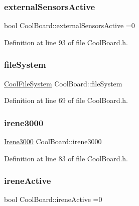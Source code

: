 \subsubsection{\texorpdfstring{external\+Sensors\+Active}{externalSensorsActive}}
{\footnotesize\ttfamily bool Cool\+Board\+::external\+Sensors\+Active =0\hspace{0.3cm}{\ttfamily [private]}}



Definition at line 93 of file Cool\+Board.\+h.

\mbox{\label{class_cool_board_a42c2586fbb13ff7f06538e9284e8538d}} 
\subsubsection{\texorpdfstring{file\+System}{fileSystem}}
{\footnotesize\ttfamily \hyperlink{class_cool_file_system}{Cool\+File\+System} Cool\+Board\+::file\+System\hspace{0.3cm}{\ttfamily [private]}}



Definition at line 69 of file Cool\+Board.\+h.

\mbox{\label{class_cool_board_ad103718ce316006c4695b8eb312eaf11}} 
\subsubsection{\texorpdfstring{irene3000}{irene3000}}
{\footnotesize\ttfamily \hyperlink{class_irene3000}{Irene3000} Cool\+Board\+::irene3000\hspace{0.3cm}{\ttfamily [private]}}



Definition at line 83 of file Cool\+Board.\+h.

\mbox{\label{class_cool_board_a9c3f7ac625481ee2ae802a25d97a4ae0}} 
\subsubsection{\texorpdfstring{irene\+Active}{ireneActive}}
{\footnotesize\ttfamily bool Cool\+Board\+::irene\+Active =0\hspace{0.3cm}{\ttfamily [private]}}




